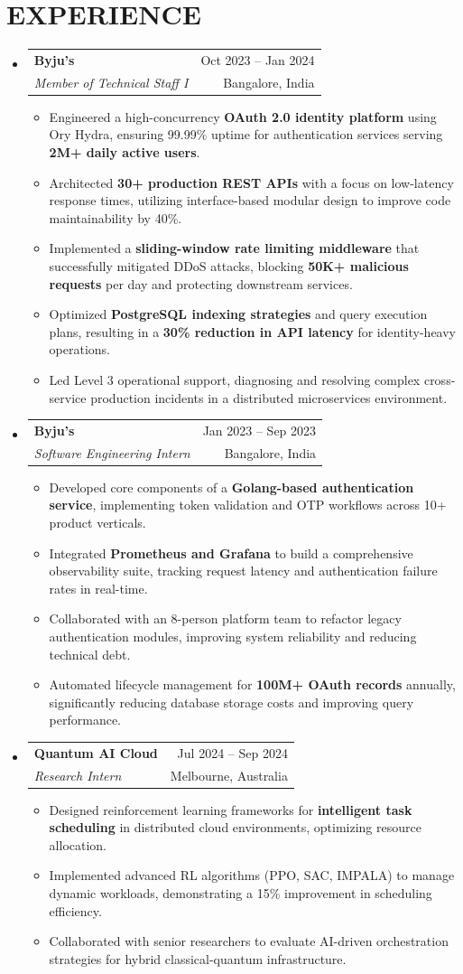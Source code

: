 \documentclass[letterpaper,11pt]{article}
\makeatletter
\newcommand{\resumeItem}[1]{\item\small{{#1 \vspace{-1pt}}}}
\newcommand{\resumeSubheading}[4]{\vspace{-1pt}\item\begin{tabular*}{\textwidth}[t]{l@{\extracolsep{\fill}}r}\textbf{#1} & {\color{dark-grey}\small #2}\vspace{1pt}\\\textit{#3} & {\color{dark-grey} \small #4}\\\end{tabular*}\vspace{-4pt}}
\newcommand{\resumeSubHeadingListStart}{\begin{itemize}[leftmargin=0in, label={}]}
\newcommand{\resumeSubHeadingListEnd}{\end{itemize}}
\newcommand{\resumeItemListStart}{\begin{itemize}}
\newcommand{\resumeItemListEnd}{\end{itemize}\vspace{0pt}}
\makeatother
\begin{document}
\section{EXPERIENCE}
\resumeSubHeadingListStart
\resumeSubheading{Byju’s}{Oct 2023 -- Jan 2024}{Member of Technical Staff I}{Bangalore, India}
\resumeItemListStart
\resumeItem{Engineered a high-concurrency \textbf{OAuth 2.0 identity platform} using Ory Hydra, ensuring 99.99\% uptime for authentication services serving \textbf{2M+ daily active users}.}
\resumeItem{Architected \textbf{30+ production REST APIs} with a focus on low-latency response times, utilizing interface-based modular design to improve code maintainability by 40\%.}
\resumeItem{Implemented a \textbf{sliding-window rate limiting middleware} that successfully mitigated DDoS attacks, blocking \textbf{50K+ malicious requests} per day and protecting downstream services.}
\resumeItem{Optimized \textbf{PostgreSQL indexing strategies} and query execution plans, resulting in a \textbf{30\% reduction in API latency} for identity-heavy operations.}
\resumeItem{Led Level 3 operational support, diagnosing and resolving complex cross-service production incidents in a distributed microservices environment.}
\resumeItemListEnd

\resumeSubheading{Byju’s}{Jan 2023 -- Sep 2023}{Software Engineering Intern}{Bangalore, India}
\resumeItemListStart
\resumeItem{Developed core components of a \textbf{Golang-based authentication service}, implementing token validation and OTP workflows across 10+ product verticals.}
\resumeItem{Integrated \textbf{Prometheus and Grafana} to build a comprehensive observability suite, tracking request latency and authentication failure rates in real-time.}
\resumeItem{Collaborated with an 8-person platform team to refactor legacy authentication modules, improving system reliability and reducing technical debt.}
\resumeItem{Automated lifecycle management for \textbf{100M+ OAuth records} annually, significantly reducing database storage costs and improving query performance.}
\resumeItemListEnd

\resumeSubheading{Quantum AI Cloud}{Jul 2024 -- Sep 2024}{Research Intern}{Melbourne, Australia}
\resumeItemListStart
\resumeItem{Designed reinforcement learning frameworks for \textbf{intelligent task scheduling} in distributed cloud environments, optimizing resource allocation.}
\resumeItem{Implemented advanced RL algorithms (PPO, SAC, IMPALA) to manage dynamic workloads, demonstrating a 15\% improvement in scheduling efficiency.}
\resumeItem{Collaborated with senior researchers to evaluate AI-driven orchestration strategies for hybrid classical-quantum infrastructure.}
\resumeItemListEnd
\resumeSubHeadingListEnd
\end{document}
